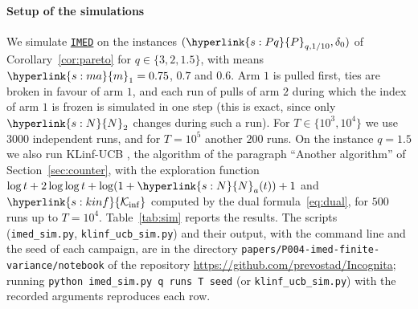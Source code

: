 \documentclass[11pt]{article}
\newcommand{\sy}[2]{{\hyperlink{#1}{#2}}}
\newcommand{\imed}{\hyperref[alg:imed]{\texttt{IMED}}}
\newcommand{\marm}{\sy{s:ma}{m}}
\newcommand{\Kinf}{\sy{s:kinf}{\mathcal{K}_{\inf}}}
\newcommand{\Np}{\sy{s:N}{N}}
\newcommand{\Pq}{\sy{s:Pq}{P}}
\begin{document}
\paragraph{Setup of the simulations} We simulate \imed{} on the instances $(\Pq_{q,1/10},\delta_0)$ of
Corollary~\ref{cor:pareto} for $q\in\{3,2,1.5\}$, with means $\marm_1=0.75$, $0.7$ and $0.6$. Arm $1$
is pulled first, ties are broken in favour of arm $1$, and each run of pulls of arm $2$ during
which the index of arm $1$ is frozen is simulated in one step (this is exact, since only $\Np_2$
changes during such a run). For $T\in\{10^3,10^4\}$ we use $3000$ independent runs, and for
$T=10^5$ another $200$ runs. On the instance $q=1.5$ we also run KLinf-UCB
\citep[Section~3]{PA26}, the algorithm of the paragraph ``Another algorithm'' of
Section~\ref{sec:counter}, with the exploration function $\log t+2\log\log t+\log(1+\Np_a(t))+1$
and $\Kinf$ computed by the dual formula~\eqref{eq:dual}, for $500$ runs up to $T=10^4$.
Table~\ref{tab:sim} reports the results. The scripts (\texttt{imed\_sim.py},
\texttt{klinf\_ucb\_sim.py}) and their output, with the command line and the seed of each
campaign, are in the directory \texttt{papers/P004-imed-finite-variance/notebook} of the
repository \url{https://github.com/prevostad/Incognita}; running
\texttt{python imed\_sim.py q runs T seed} (or \texttt{klinf\_ucb\_sim.py}) with the recorded
arguments reproduces each row.
\end{document}
